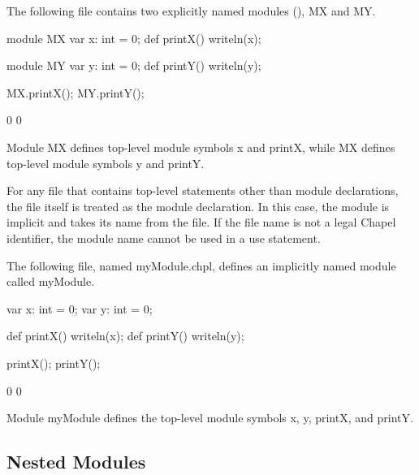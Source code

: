 \begin{example}
The following file contains two explicitly named modules
(), MX and MY.
\begin{chapelpre}
\end{chapelpre}
\begin{chapel}
module MX {
  var x: int = 0;
  def printX() {
    writeln(x);
  }
}

module MY {
  var y: int = 0;
  def printY() {
    writeln(y);
  }
}
\end{chapel}
\begin{chapelpost}
MX.printX();
MY.printY();
\end{chapelpost}
\begin{chapeloutput}
0
0
\end{chapeloutput}
Module MX defines top-level module symbols x and printX, while MX
defines top-level module symbols y and printY.
\end{example}

For any file that contains top-level statements other than module
declarations, the file itself is treated as the module declaration.
In this case,
the module is implicit and takes its name from the file.  If the file name is
not a legal Chapel identifier, the module name cannot be used in a use
statement.

\begin{example}
The following file, named myModule.chpl, defines an implicitly named
module called myModule.
\begin{chapelpre}
\end{chapelpre}
\begin{chapel}
var x: int = 0;
var y: int = 0;

def printX() {
  writeln(x);
}
def printY() {
  writeln(y);
}
\end{chapel}
\begin{chapelpost}
printX();
printY();
\end{chapelpost}
\begin{chapeloutput}
0
0
\end{chapeloutput}
Module myModule defines the top-level module symbols x, y, printX, and
printY.
\end{example}


\subsection{Nested Modules}
\label{Nested_Modules}

